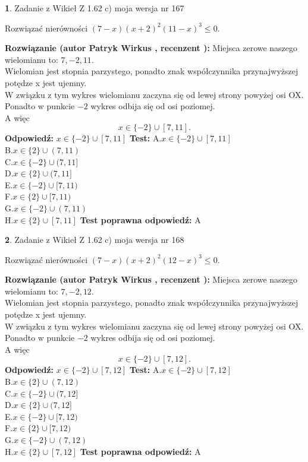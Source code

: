 \documentclass[12pt, a4paper]{article}
\theoremstyle{definition} %
\newtheorem{zad}{}
\newcommand{\zadStart}[1]{\begin{zad}#1\newline}
\newcommand{\zadStop}{\end{zad}}
\newcommand{\rozwStart}[2]{\noindent \textbf{Rozwiązanie (autor #1 , recenzent #2): }\newline}
\newcommand{\rozwStop}{\newline}
\newcommand{\odpStart}{\noindent \textbf{Odpowiedź:}\newline}
\newcommand{\odpStop}{\newline}
\newcommand{\testStart}{\noindent \textbf{Test:}\newline}
\newcommand{\testStop}{\newline}
\newcommand{\kluczStart}{\noindent \textbf{Test poprawna odpowiedź:}\newline}
\newcommand{\kluczStop}{\newline}
\begin{document}
\zadStart{Zadanie z Wikieł Z 1.62 c) moja wersja nr 167}

Rozwiązać nierówności $(7-x)(x+2)^{2}(11-x)^{3}\le0$.
\zadStop
\rozwStart{Patryk Wirkus}{}
Miejsca zerowe naszego wielomianu to: $7, -2, 11$.\\
Wielomian jest stopnia parzystego, ponadto znak współczynnika przy\linebreak najwyższej potędze x jest ujemny.\\ W związku z tym wykres wielomianu zaczyna się od lewej strony powyżej osi OX.\\
Ponadto w punkcie $-2$ wykres odbija się od osi poziomej.\\
A więc $$x \in \{-2\} \cup [7,11].$$
\rozwStop
\odpStart
$x \in \{-2\} \cup [7,11]$
\odpStop
\testStart
A.$x \in \{-2\} \cup [7,11]$\\
B.$x \in \{2\} \cup (7,11)$\\
C.$x \in \{-2\} \cup (7,11]$\\
D.$x \in \{2\} \cup (7,11]$\\
E.$x \in \{-2\} \cup [7,11)$\\
F.$x \in \{2\} \cup [7,11)$\\
G.$x \in \{-2\} \cup (7,11)$\\
H.$x \in \{2\} \cup [7,11]$
\testStop
\kluczStart
A
\kluczStop



\zadStart{Zadanie z Wikieł Z 1.62 c) moja wersja nr 168}

Rozwiązać nierówności $(7-x)(x+2)^{2}(12-x)^{3}\le0$.
\zadStop
\rozwStart{Patryk Wirkus}{}
Miejsca zerowe naszego wielomianu to: $7, -2, 12$.\\
Wielomian jest stopnia parzystego, ponadto znak współczynnika przy\linebreak najwyższej potędze x jest ujemny.\\ W związku z tym wykres wielomianu zaczyna się od lewej strony powyżej osi OX.\\
Ponadto w punkcie $-2$ wykres odbija się od osi poziomej.\\
A więc $$x \in \{-2\} \cup [7,12].$$
\rozwStop
\odpStart
$x \in \{-2\} \cup [7,12]$
\odpStop
\testStart
A.$x \in \{-2\} \cup [7,12]$\\
B.$x \in \{2\} \cup (7,12)$\\
C.$x \in \{-2\} \cup (7,12]$\\
D.$x \in \{2\} \cup (7,12]$\\
E.$x \in \{-2\} \cup [7,12)$\\
F.$x \in \{2\} \cup [7,12)$\\
G.$x \in \{-2\} \cup (7,12)$\\
H.$x \in \{2\} \cup [7,12]$
\testStop
\kluczStart
A
\kluczStop
\end{document}
